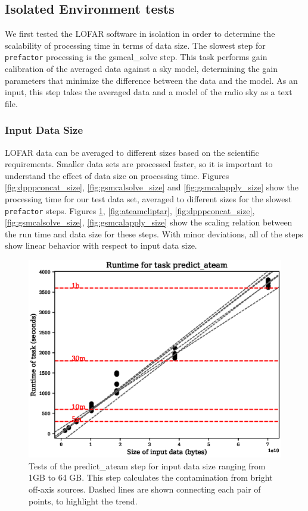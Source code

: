 \documentclass[preprint,5p]{elsarticle}
\begin{document}
\subsection{Isolated Environment tests}
We first tested the LOFAR software in isolation in order to determine the scalability of processing time in terms of data size. The slowest step for \texttt{prefactor} processing is the gsmcal\_solve step. This task performs gain calibration of the averaged data against a sky model, determining the gain parameters that minimize the difference between the data and the model. As an input, this step takes the averaged data and a model of the radio sky as a text file. 

\subsubsection{Input Data Size}\label{sec:results_size}
LOFAR data can be averaged to different sizes based on the scientific requirements. Smaller data sets are processed faster, so it is important to understand the effect of data size on processing time. Figures \ref{fig:dpppconcat_size}, \ref{fig:gsmcalsolve_size} and \ref{fig:gsmcalapply_size}  show the processing time for our test data set, averaged to different sizes for the slowest \texttt{prefactor} steps. Figures \ref{fig:predict_ateam}, \ref{fig:ateamcliptar}, \ref{fig:dpppconcat_size}, \ref{fig:gsmcalsolve_size}, \ref{fig:gsmcalapply_size} show the scaling relation between the run time and data size for these steps. With minor deviations, all of the steps show linear behavior with respect to input data size.


\begin{figure}
    \includegraphics[width=0.95\linewidth]{figures/predict_ateam_size.eps}
      \caption{Tests of the predict\_ateam step for input data size ranging from 1GB to 64 GB. This step calculates the contamination from bright off-axis sources. Dashed lines are shown connecting each pair of points, to highlight the trend. }
	\label{fig:predict_ateam}
\end{figure}
\end{document}
